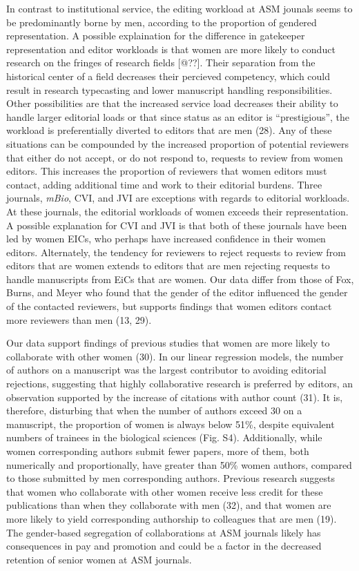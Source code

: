\documentclass[11pt,]{article}
\begin{document}
In contrast to institutional service, the editing workload at ASM
jounals seems to be predominantly borne by men, according to the
proportion of gendered representation. A possible explaination for the
difference in gatekeeper representation and editor workloads is that
women are more likely to conduct research on the fringes of research
fields {[}@??{]}. Their separation from the historical center of a field
decreases their percieved competency, which could result in research
typecasting and lower manuscript handling responsibilities. Other
possibilities are that the increased service load decreases their
ability to handle larger editorial loads or that since status as an
editor is ``prestigious'', the workload is preferentially diverted to
editors that are men (28). Any of these situations can be compounded by
the increased proportion of potential reviewers that either do not
accept, or do not respond to, requests to review from women editors.
This increases the proportion of reviewers that women editors must
contact, adding additional time and work to their editorial burdens.
Three journals, \emph{mBio}, CVI, and JVI are exceptions with regards to
editorial workloads. At these journals, the editorial workloads of women
exceeds their representation. A possible explanation for CVI and JVI is
that both of these journals have been led by women EICs, who perhaps
have increased confidence in their women editors. Alternately, the
tendency for reviewers to reject requests to review from editors that
are women extends to editors that are men rejecting requests to handle
manuscripts from EiCs that are women. Our data differ from those of Fox,
Burns, and Meyer who found that the gender of the editor influenced the
gender of the contacted reviewers, but supports findings that women
editors contact more reviewers than men (13, 29).

Our data support findings of previous studies that women are more likely
to collaborate with other women (30). In our linear regression models,
the number of authors on a manuscript was the largest contributor to
avoiding editorial rejections, suggesting that highly collaborative
research is preferred by editors, an observation supported by the
increase of citations with author count (31). It is, therefore,
disturbing that when the number of authors exceed 30 on a manuscript,
the proportion of women is always below 51\%, despite equivalent numbers
of trainees in the biological sciences (Fig. S4). Additionally, while
women corresponding authors submit fewer papers, more of them, both
numerically and proportionally, have greater than 50\% women authors,
compared to those submitted by men corresponding authors. Previous
research suggests that women who collaborate with other women receive
less credit for these publications than when they collaborate with men
(32), and that women are more likely to yield corresponding authorship
to colleagues that are men (19). The gender-based segregation of
collaborations at ASM journals likely has consequences in pay and
promotion and could be a factor in the decreased retention of senior
women at ASM journals.
\end{document}
